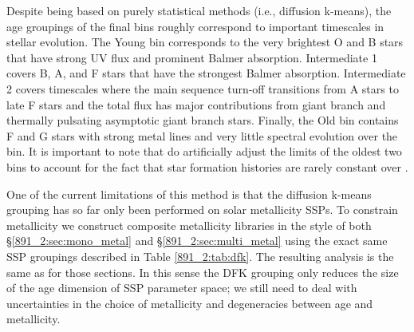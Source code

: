 Despite being based on purely statistical methods (i.e., diffusion
k-means), the age groupings of the final bins roughly correspond to
important timescales in stellar evolution. The Young bin corresponds
to the very brightest O and B stars that have strong UV flux and
prominent Balmer absorption. Intermediate 1 covers B, A, and F stars
that have the strongest Balmer absorption. Intermediate 2 covers
timescales where the main sequence turn-off transitions from A stars
to late F stars and the total flux has major contributions from giant
branch and thermally pulsating asymptotic giant branch stars. Finally,
the Old bin contains F and G stars with strong metal lines and very
little spectral evolution over the bin. It is important to note that
 do artificially adjust the limits of the oldest
two bins to account for the fact that star formation histories are
rarely constant over .





One of the current limitations of this method is that the diffusion k-means
grouping has so far only been performed on solar metallicity SSPs. To
constrain metallicity we construct composite metallicity libraries in the
style of both \S\ref{891_2:sec:mono_metal} and \S\ref{891_2:sec:multi_metal} using the
exact same SSP groupings described in Table \ref{891_2:tab:dfk}. The resulting
analysis is the same as for those sections. In this sense the DFK grouping
only reduces the size of the age dimension of SSP parameter space; we still
need to deal with uncertainties in the choice of metallicity and degeneracies
between age and metallicity.

